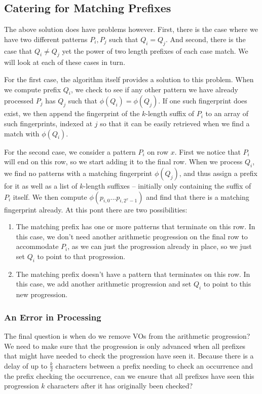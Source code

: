 \documentclass[ %
                    author={Dominic Joseph Moylett},
                    degree={MEng},
                     title={Dictionary Matching with Fingerprints},
                  subtitle={An Empirical Analysis},
                      type={research},
                      year={2015} ]{dissertation}
\begin{document}
\subsection{Catering for Matching Prefixes}

The above solution does have problems however. First, there is the case where we have two different patterns $P_i, P_j$ such that $Q_i = Q_j$. And second, there is the case that $Q_i \neq Q_j$ yet the power of two length prefixes of each case match. We will look at each of these cases in turn.

For the first case, the algorithm itself provides a solution to this problem. When we compute prefix $Q_i$, we check to see if any other pattern we have already processed $P_j$ has $Q_j$ such that $\phi(Q_i) = \phi(Q_j)$. If one such fingerprint does exist, we then append the fingerprint of the $k$-length suffix of $P_i$ to an array of such fingerprints, indexed at $j$ so that it can be easily retrieved when we find a match with $\phi(Q_i)$.

For the second case, we consider a pattern $P_i$ on row $x$. First we notice that $P_i$ will end on this row, so we start adding it to the final row. When we process $Q_i$, we find no patterns with a matching fingerprint $\phi(Q_j)$, and thus assign a prefix for it as well as a list of $k$-length suffixes -- initially only containing the suffix of $P_i$ itself. We then compute $\phi(p_{i,0}...p_{i,2^x-1})$ and find that there is a matching fingerprint already. At this pont there are two possibilities:

\begin{enumerate}
  \item The matching prefix has one or more patterns that terminate on this row. In this case, we don't need another arithmetic progression on the final row to accommodate $P_i$, as we can just the progression already in place, so we just set $Q_i$ to point to that progression.
  \item The matching prefix doesn't have a pattern that terminates on this row. In this case, we add another arithmetic progression and set $Q_i$ to point to this new progression.
\end{enumerate}

\subsubsection{An Error in Processing}
\label{sssec:error-prob}

The final question is when do we remove VOs from the arithmetic progression? We need to make sure that the progression is only advanced when all prefixes that might have needed to check the progression have seen it. Because there is a delay of up to $\frac{k}{2}$ characters between a prefix needing to check an occurrence and the prefix checking the occurrence, can we ensure that all prefixes have seen this progression $k$ characters after it has originally been checked?
\end{document}
